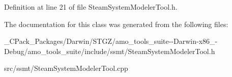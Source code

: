 Definition at line 21 of file Steam\+System\+Modeler\+Tool.\+h.



The documentation for this class was generated from the following files\+:\begin{DoxyCompactItemize}
\item 
\+\_\+\+C\+Pack\+\_\+\+Packages/\+Darwin/\+S\+T\+G\+Z/amo\+\_\+tools\+\_\+suite-\/-\/\+Darwin-\/x86\+\_-\/\+Debug/amo\+\_\+tools\+\_\+suite/include/ssmt/Steam\+System\+Modeler\+Tool.\+h\item 
src/ssmt/Steam\+System\+Modeler\+Tool.\+cpp\end{DoxyCompactItemize}
